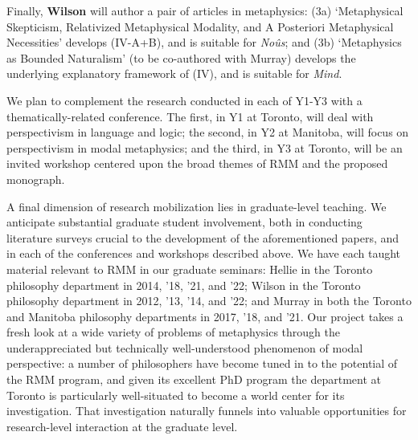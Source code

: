 \documentclass[12pt]{article}
\begin{document}
\smallskip{}

Finally, \textbf{Wilson} will author a pair of articles in metaphysics: (3a)
`Metaphysical Skepticism, Relativized Metaphysical Modality, and A Posteriori
Metaphysical Necessities' develops (IV-A+B), and is suitable for
\emph{No\^{u}s}; and (3b) `Metaphysics as Bounded 
Naturalism' (to be co-authored with Murray) develops the underlying
explanatory framework of (IV), and is suitable for \emph{Mind}.  

\smallskip{}

We plan to complement the research conducted in each of Y1-Y3 with a
thematically-related conference. The first, in Y1 at Toronto, will deal with
perspectivism in language and logic; the second, in Y2 at Manitoba, will focus on
perspectivism in modal metaphysics; and the third, in Y3 at Toronto, will be an
invited workshop centered upon the broad themes of RMM and the proposed
monograph. 

\smallskip{}

A final dimension of research mobilization lies in graduate-level teaching. We
anticipate substantial graduate student involvement, both in conducting
literature surveys crucial to the development of the aforementioned papers,
and in each of the conferences and workshops described above. We have each
taught material relevant to RMM in our graduate seminars: Hellie in the
Toronto philosophy department in 2014, '18, '21, and '22; Wilson in the
Toronto philosophy department in 2012, '13, '14, and '22; and Murray in both
the Toronto and Manitoba philosophy departments in 2017, '18, and '21.  Our
project takes a fresh look at a wide variety of problems of metaphysics
through the underappreciated but technically well-understood phenomenon of
modal perspective: a number of philosophers have become tuned in to the
potential of the RMM program, and given its excellent PhD program the
department at Toronto is particularly well-situated to become a world center for its
investigation. That investigation naturally funnels into valuable
opportunities for research-level interaction at the graduate level. 
\end{document}
